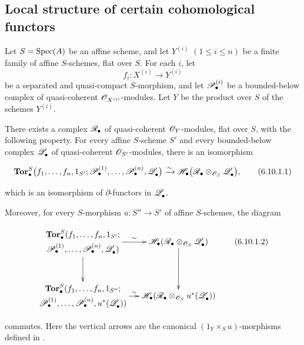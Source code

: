 \subsection{Local structure of certain cohomological functors}
\label{subsection:III.6.10}
\label{III.6.10}

\begin{proposition}[6.10.1]
\label{III.6.10.1}
Let $S=\operatorname{Spec}(A)$ be an affine scheme, and let
$Y^{(i)}$ $(1\leq i\leq n)$ be a finite family of affine
$S$-schemes, flat over $S$.  For each $i$, let
\[
  f_i:X^{(i)}\longrightarrow Y^{(i)}
\]
be a separated and quasi-compact $S$-morphism, and let
$\mathscr{P}_\bullet^{(i)}$ be a bounded-below complex of
quasi-coherent $\mathscr{O}_{X^{(i)}}$-modules.  Let $Y$ be the product
over $S$ of the schemes $Y^{(i)}$.

There exists a complex $\mathscr{R}_\bullet$ of quasi-coherent
$\mathscr{O}_Y$-modules, flat over $S$, with the following property.
For every affine $S$-scheme $S'$ and every bounded-below complex
$\mathscr{Q}_\bullet'$ of quasi-coherent $\mathscr{O}_{S'}$-modules, there is
an isomorphism
\begin{env}[6.10.1.1]
\label{III.6.10.1.1}
\[
  \mathbf{Tor}_\bullet^S
  \bigl(
    f_1,\ldots,f_n,1_{S'};
    \mathscr{P}_\bullet^{(1)},\ldots,\mathscr{P}_\bullet^{(n)},
    \mathscr{Q}_\bullet'
  \bigr)
  \xrightarrow{\sim}
  \mathscr{H}_\bullet
  \bigl(
    \mathscr{R}_\bullet\otimes_{\mathscr{O}_S}\mathscr{Q}_\bullet'
  \bigr),
  \tag{6.10.1.1}\label{III.6.10.1.1.eq}
\]
\end{env}
which is an isomorphism of $\partial$-functors in
$\mathscr{Q}_\bullet'$.

Moreover, for every $S$-morphism
$u:S''\to S'$ of affine $S$-schemes, the diagram
\begin{env}[6.10.1.2]
\label{III.6.10.1.2}
\[
\xymatrix@C=12pt@R=30pt{
  {\begin{gathered}
    \mathbf{Tor}_\bullet^S
    (f_1,\ldots,f_n,1_{S'};\\
    \sh P_\bullet^{(1)},\ldots,\sh P_\bullet^{(n)},
    \sh Q_\bullet')
  \end{gathered}}
  \ar[r]^-{\sim}\ar[d]
  &
  {\sh H_\bullet
    (\sh R_\bullet\otimes_{\sh O_S}\sh Q_\bullet')}
  \ar[d]
  \\
  {\begin{gathered}
    \mathbf{Tor}_\bullet^S
    (f_1,\ldots,f_n,1_{S''};\\
    \sh P_\bullet^{(1)},\ldots,\sh P_\bullet^{(n)},
    u^*(\sh Q_\bullet'))
  \end{gathered}}
  \ar[r]^-{\sim}
  &
  {\sh H_\bullet
    (\sh R_\bullet\otimes_{\sh O_S}u^*(\sh Q_\bullet'))}
}
\tag{6.10.1.2}\label{III.6.10.1.2.eq}
\]
\end{env}
commutes.  Here the vertical arrows are the canonical
$(1_Y\times_Su)$-morphisms defined in .
\end{proposition}

